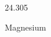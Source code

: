 \documentclass[12pt]{article}
\begin{document}
\hfill{}
\vfill
\begin{center}
  {\fontsize{50}{60}
  }

  24.305

Magnesium
\end{center}
\vfill
\end{document}

